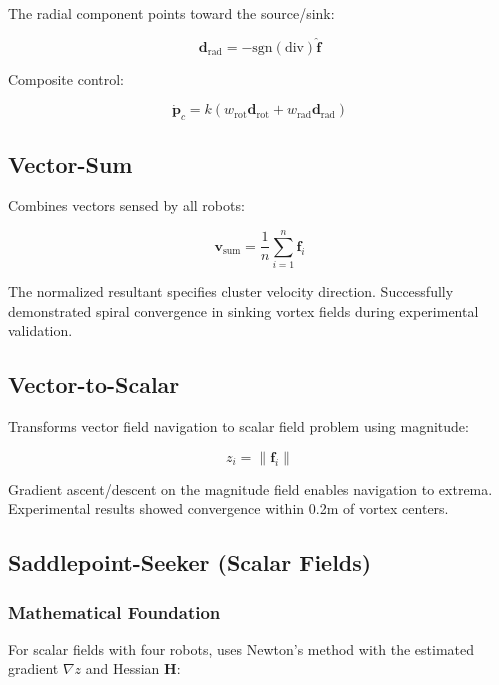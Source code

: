 \documentclass{article}
\begin{document}
The radial component points toward the source/sink:

\begin{equation}
\mathbf{d}_\text{rad} = -\text{sgn}(\text{div}) \hat{\mathbf{f}}
\end{equation}

Composite control:

\begin{equation}
\dot{\mathbf{p}}_c = k(w_\text{rot}\mathbf{d}_\text{rot} + w_\text{rad}\mathbf{d}_\text{rad})
\end{equation}

\subsection{Vector-Sum}

Combines vectors sensed by all robots:

\begin{equation}
\mathbf{v}_{\text{sum}} = \frac{1}{n}\sum_{i=1}^{n} \mathbf{f}_i
\end{equation}

The normalized resultant specifies cluster velocity direction. Successfully demonstrated spiral convergence in sinking vortex fields during experimental validation.

\subsection{Vector-to-Scalar}

Transforms vector field navigation to scalar field problem using magnitude:

\begin{equation}
z_i = \|\mathbf{f}_i\|
\end{equation}

Gradient ascent/descent on the magnitude field enables navigation to extrema. Experimental results showed convergence within 0.2m of vortex centers.

\subsection{Saddlepoint-Seeker (Scalar Fields)}

\subsubsection{Mathematical Foundation}

For scalar fields with four robots, uses Newton's method with the estimated gradient $\nabla z$ and Hessian $\mathbf{H}$:
\end{document}
